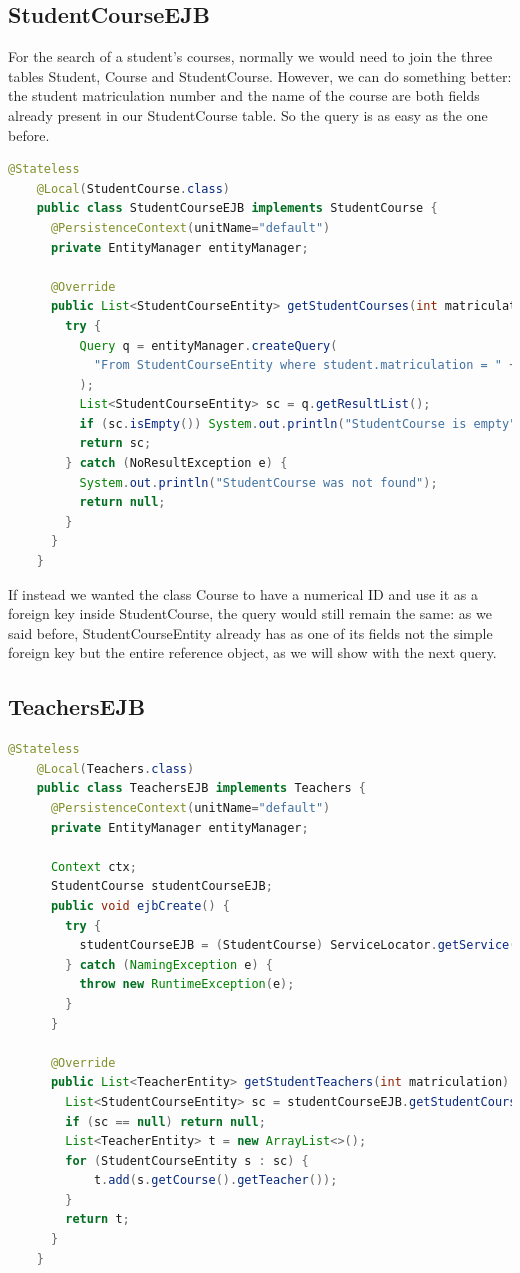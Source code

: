 \documentclass[12pt, a4paper]{article}
\begin{document}
  \subsection{StudentCourseEJB}
  For the search of a student's courses, normally we would need to join the three tables Student, Course and StudentCourse. However, we can do something better: the student matriculation number and the name of the course are both fields already present in our StudentCourse table. So the query is as easy as the one before.

  \begin{lstlisting}[language=java, caption={StudentCourseEJB}]
    @Stateless
    @Local(StudentCourse.class)
    public class StudentCourseEJB implements StudentCourse {
      @PersistenceContext(unitName="default")
      private EntityManager entityManager;

      @Override
      public List<StudentCourseEntity> getStudentCourses(int matriculation) {
        try {
          Query q = entityManager.createQuery(
            "From StudentCourseEntity where student.matriculation = " + matriculation
          );
          List<StudentCourseEntity> sc = q.getResultList();
          if (sc.isEmpty()) System.out.println("StudentCourse is empty");
          return sc;
        } catch (NoResultException e) {
          System.out.println("StudentCourse was not found");
          return null;
        }
      }
    }
  \end{lstlisting}

  If instead we wanted the class Course to have a numerical ID and use it as a foreign key inside StudentCourse, the query would still remain the same: as we said before, StudentCourseEntity already has as one of its fields not the simple foreign key but the entire reference object, as we will show with the next query.

  \pagebreak
  \subsection{TeachersEJB}

  \begin{lstlisting}[language=java, caption={TeachersEJB}]
    @Stateless
    @Local(Teachers.class)
    public class TeachersEJB implements Teachers {
      @PersistenceContext(unitName="default")
      private EntityManager entityManager;

      Context ctx;
      StudentCourse studentCourseEJB;
      public void ejbCreate() {
        try {
          studentCourseEJB = (StudentCourse) ServiceLocator.getService("java:module/StudentCourseEJB!it.marrocco.marroccoass4_2server.ejb.StudentCourse");
        } catch (NamingException e) {
          throw new RuntimeException(e);
        }
      }

      @Override
      public List<TeacherEntity> getStudentTeachers(int matriculation) {
        List<StudentCourseEntity> sc = studentCourseEJB.getStudentCourses(matriculation);
        if (sc == null) return null;
        List<TeacherEntity> t = new ArrayList<>();
        for (StudentCourseEntity s : sc) {
            t.add(s.getCourse().getTeacher());
        }
        return t;
      }
    }
  \end{lstlisting}
\end{document}
